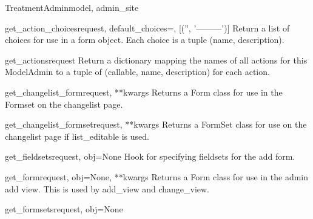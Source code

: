 \documentclass[letterpaper,10pt,english]{sphinxmanual}
\begin{document}
\begin{classdesc}{TreatmentAdmin}{model, admin\_site}
\hypertarget{data.admin.TreatmentAdmin.get_action_choices}{}\begin{methoddesc}{get\_action\_choices}{request, default\_choices=, {[}('', '---------'){]}}
Return a list of choices for use in a form object.  Each choice is a
tuple (name, description).
\end{methoddesc}

\hypertarget{data.admin.TreatmentAdmin.get_actions}{}\begin{methoddesc}{get\_actions}{request}
Return a dictionary mapping the names of all actions for this
ModelAdmin to a tuple of (callable, name, description) for each action.
\end{methoddesc}

\hypertarget{data.admin.TreatmentAdmin.get_changelist_form}{}\begin{methoddesc}{get\_changelist\_form}{request, **kwargs}
Returns a Form class for use in the Formset on the changelist page.
\end{methoddesc}

\hypertarget{data.admin.TreatmentAdmin.get_changelist_formset}{}\begin{methoddesc}{get\_changelist\_formset}{request, **kwargs}
Returns a FormSet class for use on the changelist page if list\_editable
is used.
\end{methoddesc}

\hypertarget{data.admin.TreatmentAdmin.get_fieldsets}{}\begin{methoddesc}{get\_fieldsets}{request, obj=None}
Hook for specifying fieldsets for the add form.
\end{methoddesc}

\hypertarget{data.admin.TreatmentAdmin.get_form}{}\begin{methoddesc}{get\_form}{request, obj=None, **kwargs}
Returns a Form class for use in the admin add view. This is used by
add\_view and change\_view.
\end{methoddesc}

\hypertarget{data.admin.TreatmentAdmin.get_formsets}{}\begin{methoddesc}{get\_formsets}{request, obj=None}\end{methoddesc}


\end{classdesc}
\end{document}
